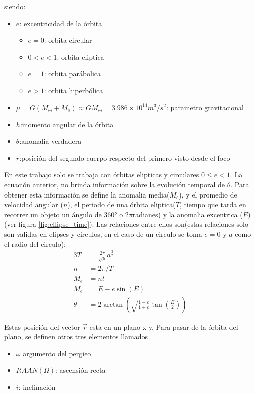 siendo: 
\begin{itemize}
	\item $e$: excentricidad de la órbita
	\begin{itemize}
		\item $e = 0$: orbita circular
		\item $0<e <1$: orbita eliptica
		\item $e=1$: orbita parábolica
		\item $e>1$: orbita hiperbólica		
	\end{itemize}
	\item $\mu = G(M_{\oplus}+M_s) \approx G M_{\oplus} = 3.986 \times 10^{14} m^3/s^2 $: parametro gravitacional
	\item $h$:momento angular de la órbita
	\item $\theta$:anomalia verdadera
	\item $r$:posición del segundo cuerpo respecto del primero visto desde el foco
\end{itemize}

En este trabajo solo se trabaja con órbitas elipticas y circulares $0\leq e < 1$. La ecuación anterior, no brinda información sobre la evolución temporal de $\theta$. Para obtener esta información se define la anomalia media($M_e$), y el promedio de velocidad angular ($n$), el periodo de una órbita eliptica($T$, tiempo que tarda en recorrer un objeto un ángulo de 360° o 2$\pi $radianes) y la anomalia excentrica ($E$)(ver figura \ref{fig:ellipse_time}). Las relaciones entre ellos son(estas relaciones solo son validas en elipses y circulos, en el caso de un circulo se toma $e =0$ y $a$ como el radio del circulo):  
\begin{alignat}{3}
	T &= \frac{2\pi}{\sqrt{\mu}} a^{\frac{3}{2}} \\
	n &= 2\pi / T \\ 
	M_e &= nt \\
	M_e &= E-e\sin(E) \\
	\theta &= 2\arctan({  \sqrt{\frac{1-e}{1+e}}\tan(\frac{E}{2})})
\end{alignat}

Estas posición del vector $\vec{r}$ esta en un plano x-y. Para pasar de la órbita del plano, se definen otros tres elementos llamados
\begin{itemize}
	\item $\omega$ argumento del pergieo 
	\item $RAAN (\Omega)$: ascensión recta 
	\item $i$: inclinación  
\end{itemize}





